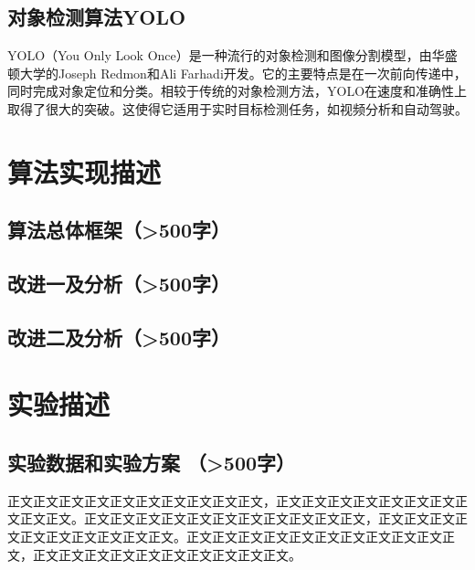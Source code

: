 \documentclass{article}
\begin{document}
\subsection{对象检测算法YOLO}
YOLO（You Only Look Once）\cite{ref9}是一种流行的对象检测和图像分割模型，由华盛顿大学的Joseph Redmon和Ali Farhadi开发。它的主要特点是在一次前向传递中，同时完成对象定位和分类。相较于传统的对象检测方法，YOLO在速度和准确性上取得了很大的突破。这使得它适用于实时目标检测任务，如视频分析和自动驾驶。


\section{算法实现描述}


\subsection{算法总体框架（>500字）}


\subsection{改进一及分析（>500字）}

\subsection{改进二及分析（>500字）}



\section{实验描述}
\subsection{实验数据和实验方案 （>500字）}
正文正文正文正文正文正文正文正文正文正文，正文正文正文正文正文正文正文正文正文正文。正文正文正文正文正文正文正文正文正文正文正文，正文正文正文正文正文正文正文正文正文正文。正文正文正文正文正文正文正文正文正文正文正文，正文正文正文正文正文正文正文正文正文正文。
\end{document}
